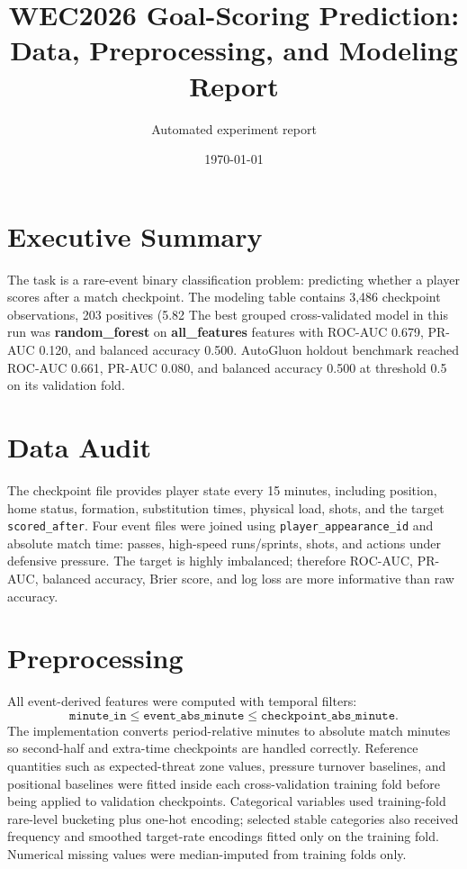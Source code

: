 \documentclass[11pt]{article}
\title{WEC2026 Goal-Scoring Prediction: Data, Preprocessing, and Modeling Report}
\author{Automated experiment report}
\date{\today}
\begin{document}
\maketitle

\section{Executive Summary}
The task is a rare-event binary classification problem: predicting whether a player scores after a match checkpoint.
The modeling table contains 3,486 checkpoint observations, 203 positives (5.82%
The best grouped cross-validated model in this run was \textbf{random\_forest} on \textbf{all\_features} features with ROC-AUC 0.679, PR-AUC 0.120, and balanced accuracy 0.500.
AutoGluon holdout benchmark reached ROC-AUC 0.661, PR-AUC 0.080, and balanced accuracy 0.500 at threshold 0.5 on its validation fold.

\section{Data Audit}
The checkpoint file provides player state every 15 minutes, including position, home status, formation, substitution times, physical load, shots, and the target \texttt{scored\_after}.
Four event files were joined using \texttt{player\_appearance\_id} and absolute match time: passes, high-speed runs/sprints, shots, and actions under defensive pressure.
The target is highly imbalanced; therefore ROC-AUC, PR-AUC, balanced accuracy, Brier score, and log loss are more informative than raw accuracy.

\section{Preprocessing}
All event-derived features were computed with temporal filters:
\[
  \texttt{minute\_in} \leq \texttt{event\_abs\_minute} \leq \texttt{checkpoint\_abs\_minute}.
\]
The implementation converts period-relative minutes to absolute match minutes so second-half and extra-time checkpoints are handled correctly.
Reference quantities such as expected-threat zone values, pressure turnover baselines, and positional baselines were fitted inside each cross-validation training fold before being applied to validation checkpoints.
Categorical variables used training-fold rare-level bucketing plus one-hot encoding; selected stable categories also received frequency and smoothed target-rate encodings fitted only on the training fold. Numerical missing values were median-imputed from training folds only.
\end{document}
